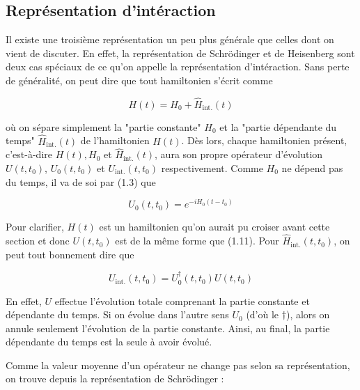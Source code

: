 \subsection{Représentation d'intéraction}
Il existe une troisième représentation un peu plus générale que celles dont on vient de discuter. En effet, la représentation de Schrödinger et de Heisenberg sont deux cas spéciaux de ce qu'on appelle la représentation d'intéraction. Sans perte de généralité, on peut dire que tout hamiltonien s'écrit comme 

\begin{equation*}
    H(t) = H_0 + \hat{H}_{\text{int.}}(t)
\end{equation*}

où on sépare simplement la "partie constante" $H_0$ et la "partie dépendante du temps" $\hat{H}_{\text{int.}}(t)$ de l'hamiltonien $H(t)$. Dès lors, chaque hamiltonien présent, c'est-à-dire $H(t), H_0$ et $\hat{H}_{\text{int.}}(t)$, aura son propre opérateur d'évolution $U(t,t_0)$, $U_0(t,t_0)$ et $U_{\text{int.}}(t,t_0)$ respectivement. Comme $H_0$ ne dépend pas du temps, il va de soi par (1.3) que 

\begin{equation*}
    U_0(t,t_0) = e^{-iH_0(t-t_0)}
\end{equation*}

Pour clarifier, $H(t)$ est un hamiltonien qu'on aurait pu croiser avant cette section et donc $U(t,t_0)$ est de la même forme que (1.11). Pour $\hat{H}_{\text{int.}}(t,t_0)$, on peut tout bonnement dire que 

\begin{equation*}
    U_{\text{int.}}(t,t_0) = U^\dagger_0(t,t_0)U(t,t_0)
\end{equation*}

En effet, $U$ effectue l'évolution totale comprenant la partie constante et dépendante du temps. Si on évolue dans l'autre sens $U_0$ (d'où le $\dagger$), alors on annule seulement l'évolution de la partie constante. Ainsi, au final, la partie dépendante du temps est la seule à avoir évolué.

Comme la valeur moyenne d'un opérateur ne change pas selon sa représentation, on trouve depuis la représentation de Schrödinger :

